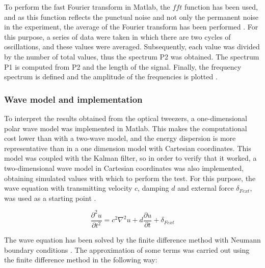 \documentclass[12pt, a4paper]{article} %
\begin{document}
\setlength{\parskip}{4mm}
\setlength{\parindent}{8pt}

To perform the fast Fourier transform in Matlab, the $fft$ function has been used, and as this function reflects the punctual noise and not only the permanent noise in the experiment, the average of the Fourier transform has been performed \cite{shabaninezhad2021matlab}. For this purpose, a series of data were taken in which there are two cycles of oscillations, and these values were averaged. Subsequently, each value was divided by the number of total values, thus the spectrum P2 was obtained. The spectrum P1 is computed from P2 and the length of the signal. Finally, the frequency spectrum is defined and the amplitude of the frequencies is plotted \cite{FourierTransform, frigo1998fftw}.

\setlength{\parskip}{0mm}
\subsubsection{Wave model and implementation}

To interpret the results obtained from the optical tweezers, a one-dimensional polar wave model was implemented in Matlab. This makes the computational cost lower than with a two-wave model, and the energy dispersion is more representative than in a one dimension model with Cartesian coordinates. This model was coupled with the Kalman filter, so in order to verify that it worked, a two-dimensional wave model in Cartesian coordinates was also implemented, obtaining simulated values with which to perform the test. For this purpose, the wave equation with transmitting velocity $c$, damping $d$ and external force $\delta_{Fext}$, was used as a starting point \cite{achenbach2012wave, d'alembert_1749}.

\setlength{\parskip}{4mm}

\begin{equation} \label{eqn:wave_model}
   \frac{\partial^{2}u}{\partial t^{2}} = c^{2}\nabla^{2}u + d\frac{\partial u}{\partial t} + \delta_{Fext}
\end{equation}

The wave equation has been solved by the finite difference method \cite{petter2017finite} with Neumann boundary conditions \cite{mathews2000metodos}. The approximation of some terms was carried out using the finite difference method in the following way:
\end{document}
